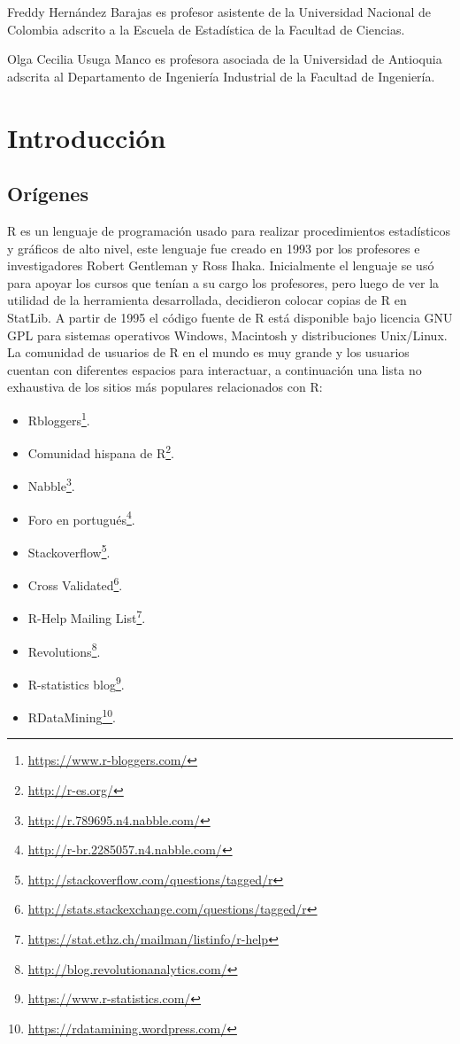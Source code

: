 \documentclass[10pt,]{krantz}
\providecommand{\tightlist}{%
  \setlength{\itemsep}{0pt}\setlength{\parskip}{0pt}}
\let\proglang=\textsf
\renewcommand{\href}[2]{#2\footnote{\url{#1}}}
\begin{document}
Freddy Hernández Barajas es profesor asistente de la Universidad
Nacional de Colombia adscrito a la Escuela de Estadística de la Facultad
de Ciencias.

Olga Cecilia Usuga Manco es profesora asociada de la Universidad de
Antioquia adscrita al Departamento de Ingeniería Industrial de la
Facultad de Ingeniería.

\mainmatter

\chapter{\texorpdfstring{Introducción
\label{intro}}{Introducción }}\label{introduccion}

\section{Orígenes} \label{sec:origenes}

\proglang{R} es un lenguaje de programación usado para realizar
procedimientos estadísticos y gráficos de alto nivel, este lenguaje fue
creado en 1993 por los profesores e investigadores Robert Gentleman y
Ross Ihaka. Inicialmente el lenguaje se usó para apoyar los cursos que
tenían a su cargo los profesores, pero luego de ver la utilidad de la
herramienta desarrollada, decidieron colocar copias de \proglang{R} en
StatLib. A partir de 1995 el código fuente de \proglang{R} está
disponible bajo licencia GNU GPL para sistemas operativos Windows,
Macintosh y distribuciones Unix/Linux. La comunidad de usuarios de
\proglang{R} en el mundo es muy grande y los usuarios cuentan con
diferentes espacios para interactuar, a continuación una lista no
exhaustiva de los sitios más populares relacionados con \proglang{R}:

\begin{itemize}
\tightlist
\item
  \href{https://www.r-bloggers.com/}{Rbloggers}.
\item
  \href{http://r-es.org/}{Comunidad hispana de \proglang{R}}.
\item
  \href{http://r.789695.n4.nabble.com/}{Nabble}.
\item
  \href{http://r-br.2285057.n4.nabble.com/}{Foro en portugués}.
\item
  \href{http://stackoverflow.com/questions/tagged/r}{Stackoverflow}.
\item
  \href{http://stats.stackexchange.com/questions/tagged/r}{Cross
  Validated}.
\item
  \href{https://stat.ethz.ch/mailman/listinfo/r-help}{\proglang{R}-Help
  Mailing List}.
\item
  \href{http://blog.revolutionanalytics.com/}{Revolutions}.
\item
  \href{https://www.r-statistics.com/}{\proglang{R}-statistics blog}.
\item
  \href{https://rdatamining.wordpress.com/}{RDataMining}.
\end{itemize}
\end{document}
